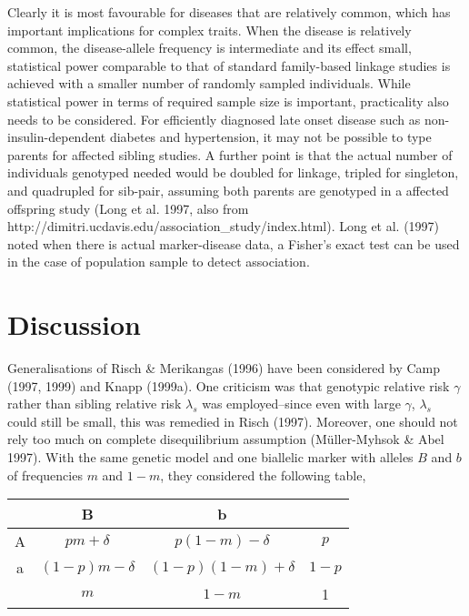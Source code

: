 Clearly it is most favourable for diseases that are relatively common, which
has important implications for complex traits.  When the disease is relatively
common, the disease-allele frequency is intermediate and its effect small,
statistical power comparable to that of standard family-based linkage studies
is achieved with a smaller number of randomly sampled individuals.  While
statistical power in terms of required sample size is important, practicality
also needs to be considered.  For efficiently diagnosed late onset disease such
as non-insulin-dependent diabetes and hypertension, it may not be possible to
type parents for affected sibling studies.  A further point is that the actual
number of individuals genotyped needed would be doubled for linkage, tripled
for singleton, and quadrupled for sib-pair, assuming both parents are genotyped
in a affected offspring study (Long et al.  1997, also from
http://dimitri.ucdavis.edu/association\_study/index.html).  Long et al.  (1997)
noted when there is actual marker-disease data, a Fisher's exact test can be
used in the case of population sample to detect association.


\section{Discussion}

Generalisations of Risch \& Merikangas (1996) have been considered by Camp
(1997, 1999) and Knapp (1999a).  One criticism was that genotypic relative risk
$\gamma$ rather than sibling relative risk $\lambda_s$ was employed--since even
with large $\gamma$, $\lambda_s$ could still be small, this was remedied in
Risch (1997).  Moreover, one should not rely too much on complete
disequilibrium assumption (M\"{u}ller-Myhsok \& Abel 1997).  With the same
genetic model and one biallelic marker with alleles $B$ and $b$ of frequencies
$m$ and $1-m$, they considered the following table,

\begin{center}
\begin{tabular}{c|cc|c}
 & B & b \\ \hline
A & $pm+\delta$ & $p(1-m)-\delta$ & $p$ \\
a & $(1-p)m-\delta$ & $(1-p)(1-m)+\delta$ & $1-p$ \\
\hline
  & $m$ & $1-m$ & 1\\
\end{tabular}
\end{center}

